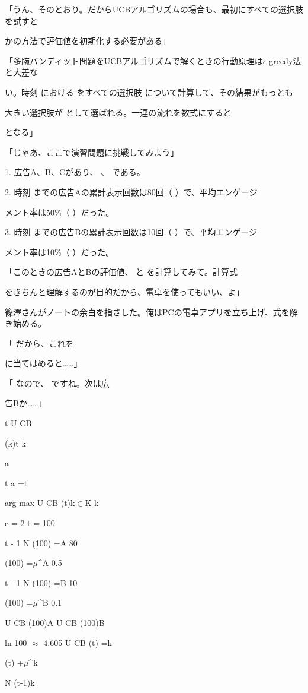 「うん、そのとおり。だからUCBアルゴリズムの場合も、最初にすべての選択肢を試すと\par
かの⽅法で評価値を初期化する必要がある」\par
「多腕バンディット問題をUCBアルゴリズムで解くときの⾏動原理は$\epsilon$-greedy法と⼤差な\par
い。時刻 における をすべての選択肢 について計算して、その結果がもっとも\par
⼤きい選択肢が として選ばれる。⼀連の流れを数式にすると\par
となる」\par
「じゃあ、ここで演習問題に挑戦してみよう」\par
1. 広告A、B、Cがあり、 、 である。\par
2. 時刻 までの広告Aの累計表⽰回数は80回（ ）で、平均エンゲージ\par
メント率は50\%（ ）だった。\par
3. 時刻 までの広告Bの累計表⽰回数は10回（ ）で、平均エンゲージ\par
メント率は10\%（ ）だった。\par
「このときの広告AとBの評価値、 と を計算してみて。計算式\par
をきちんと理解するのが⽬的だから、電卓を使ってもいい、よ」\par
篠澤さんがノートの余⽩を指さした。俺はPCの電卓アプリを⽴ち上げ、式を解き始める。\par
「 だから、これを\par
に当てはめると……」\par
「 なので、 ですね。次は広\par
告Bか……」\par
t U CB\par
(k)t k\par
a\par
t a  =t\par
arg max  U CB  (t)k$\in$K k\par
c = 2 t = 100\par
t - 1 N  (100) =A 80\par
(100) =$\mu$\textasciicircum{}A 0.5\par
t - 1 N  (100) =B 10\par
(100) =$\mu$\textasciicircum{}B 0.1\par
U CB  (100)A U CB  (100)B\par
ln 100 $\approx$ 4.605 U CB (t) =k\par
(t) +$\mu$\textasciicircum{}k\par
N  (t-1)k\par
